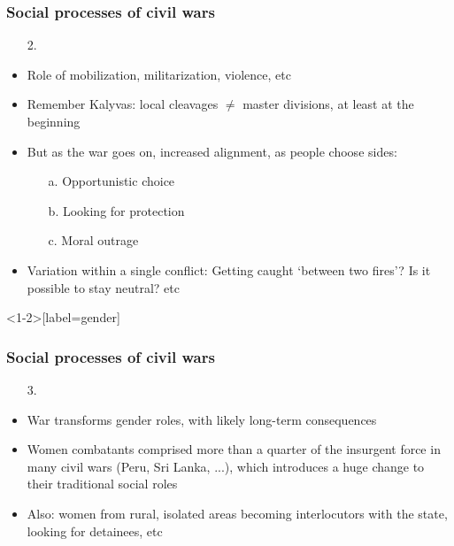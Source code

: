 \documentclass[aspectratio=43]{beamer}
\begin{document}


  
\begin{frame}
\frametitle{Social processes of civil wars}
\centering

\begin{itemize}[<+->]
  \item[2.] {\color{red}{Polarization of identities}}
  \item Role of mobilization, militarization, violence, etc
  \item Remember Kalyvas: local cleavages $\neq$ master divisions, at least at the beginning
  \item But as the war goes on, increased alignment, as people choose sides:
  \begin{itemize}
    \item[a.] Opportunistic choice
    \item[b.] Looking for protection
    \item[c.] Moral outrage
  \end{itemize}
  \item Variation within a single conflict: Getting caught `between two fires'? Is it possible to stay neutral? etc
\end{itemize}

\end{frame}

\begin{frame}<1-2>[label=gender]
\frametitle{Social processes of civil wars}
\centering

\begin{itemize}[<+->]
  \item[3.] {\color{red}{Gender roles}}
  \item War transforms gender roles, with likely long-term consequences
  \item Women combatants comprised more than a quarter of the insurgent force in many civil wars (Peru, Sri Lanka, ...), which introduces a huge change to their traditional social roles
  \item Also: women from rural, isolated areas becoming interlocutors with the state, looking for detainees, etc
\end{itemize}

\end{frame}
\end{document}
